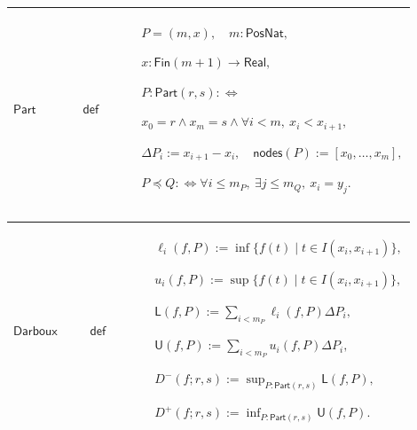 \documentclass[12pt,reqno]{amsart}
\theoremstyle{blueplain}
\numberwithin{equation}{section}
\begin{document}
{\scriptsize \setlength{\parskip}{0pt}\nointerlineskip
\noindent 
\begin{tabular}{|@{}>{\centering\arraybackslash}m{0.19251\linewidth}|>{\centering\arraybackslash}m{0.16845\linewidth}|>{\centering\arraybackslash}m{0.53904\linewidth}|}
\hline
\hypertarget{def:Part}{$\displaystyle \mathsf{Part}$} & $\displaystyle 
\mathsf{def}$ & $\displaystyle P=(m,x),\quad m:\mathsf{PosNat},$\par$%
\displaystyle x:\mathsf{Fin}(m+1)\to\mathsf{Real},$\par$\displaystyle P:%
\mathsf{Part}(r,s):\Longleftrightarrow$\par$\displaystyle x_0=r\land
x_m=s\land\forall i<m,\ x_i<x_{i+1},$\par$\displaystyle \Delta
P_i:=x_{i+1}-x_i,\quad\mathsf{nodes}(P):=[x_0,\ldots,x_m],$\par$%
\displaystyle P\preceq Q:\Longleftrightarrow\forall i\le m_P,\ \exists j\le
m_Q,\ x_i=y_j.$ \\ \hline
\end{tabular}%
}

{\scriptsize \setlength{\parskip}{0pt}\nointerlineskip
\noindent 
\begin{tabular}{|@{}>{\centering\arraybackslash}m{0.19251\linewidth}|>{\centering\arraybackslash}m{0.16845\linewidth}|>{\centering\arraybackslash}m{0.53904\linewidth}|}
\hline
\hypertarget{def:Darboux}{$\displaystyle \mathsf{Darboux}$} & $\displaystyle 
\mathsf{def}$ & $\displaystyle \ell_i(f,P):=\inf\{f(t)\mid t\in
I(x_i,x_{i+1})\},$\par$\displaystyle u_i(f,P):=\sup\{f(t)\mid t\in
I(x_i,x_{i+1})\},$\par$\displaystyle \mathsf{L}(f,P):=\sum_{i<m_P}%
\ell_i(f,P)\Delta P_i,$\par$\displaystyle \mathsf{U}(f,P):=%
\sum_{i<m_P}u_i(f,P)\Delta P_i,$\par$\displaystyle D^-(f;r,s):=\sup_{P:%
\mathsf{Part}(r,s)}\mathsf{L}(f,P),$\par$\displaystyle D^+(f;r,s):=\inf_{P:%
\mathsf{Part}(r,s)}\mathsf{U}(f,P).$ \\ \hline
\end{tabular}%
}
\end{document}
